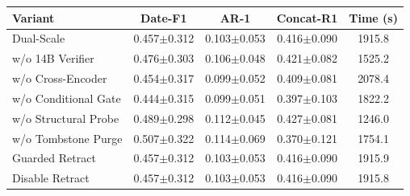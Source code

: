 \begin{tabular}{@{}lcccc@{}}
\toprule
\textbf{Variant} & \textbf{Date-F1} & \textbf{AR-1} & \textbf{Concat-R1} & \textbf{Time (s)} \\
\midrule
Dual-Scale & 0.457{\tiny$\pm$0.312} & 0.103{\tiny$\pm$0.053} & 0.416{\tiny$\pm$0.090} & 1915.8 \\
w/o 14B Verifier & 0.476{\tiny$\pm$0.303} & 0.106{\tiny$\pm$0.048} & 0.421{\tiny$\pm$0.082} & 1525.2 \\
w/o Cross-Encoder & 0.454{\tiny$\pm$0.317} & 0.099{\tiny$\pm$0.052} & 0.409{\tiny$\pm$0.081} & 2078.4 \\
w/o Conditional Gate & 0.444{\tiny$\pm$0.315} & 0.099{\tiny$\pm$0.051} & 0.397{\tiny$\pm$0.103} & 1822.2 \\
w/o Structural Probe & 0.489{\tiny$\pm$0.298} & 0.112{\tiny$\pm$0.045} & 0.427{\tiny$\pm$0.081} & 1246.0 \\
w/o Tombstone Purge & 0.507{\tiny$\pm$0.322} & 0.114{\tiny$\pm$0.069} & 0.370{\tiny$\pm$0.121} & 1754.1 \\
Guarded Retract & 0.457{\tiny$\pm$0.312} & 0.103{\tiny$\pm$0.053} & 0.416{\tiny$\pm$0.090} & 1915.9 \\
Disable Retract & 0.457{\tiny$\pm$0.312} & 0.103{\tiny$\pm$0.053} & 0.416{\tiny$\pm$0.090} & 1915.8 \\
\bottomrule
\end{tabular}
